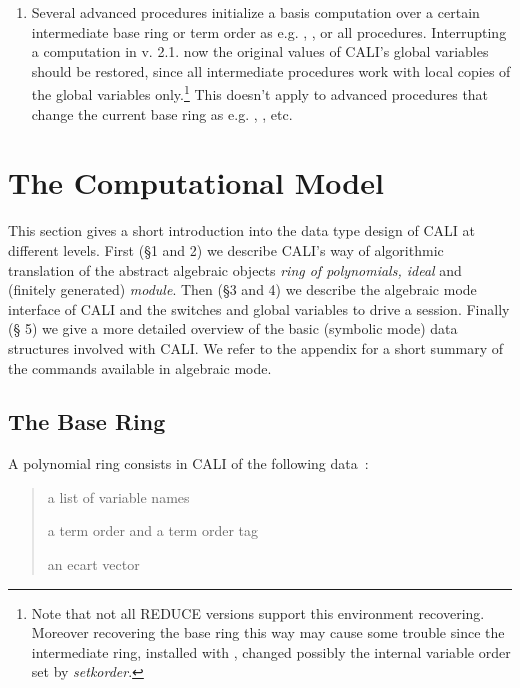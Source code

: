 \begin{enumerate}
\item Several advanced procedures initialize a \gr basis computation
over a certain intermediate base ring or term order as e.g.
, ,  or all
 procedures. Interrupting a computation in
v. 2.1. now the original values of CALI's global variables should be
restored, since all intermediate procedures work with local copies of
the global variables only.\footnote{Note that not all REDUCE versions
support this environment recovering. Moreover recovering the base
ring this way may cause some trouble since the intermediate ring,
installed with , changed possibly the internal variable
order set by {\em setkorder}.} This doesn't apply to advanced
procedures that change the current base ring as e.g. ,
,  etc.

\end{enumerate}

\section{The Computational Model}

This section gives a short introduction into the data type design of
CALI at different levels. First (\S 1 and 2) we describe CALI's way
of algorithmic translation of the abstract algebraic objects {\em
ring of polynomials, ideal} and (finitely generated) {\em module}.
Then (\S 3 and 4) we describe the algebraic mode interface of CALI
and the switches and global variables to drive a session. Finally (\S
5) we give a more detailed overview of the basic (symbolic mode) data
structures involved with CALI. We refer to the appendix for a short
summary of the commands available in algebraic mode.

\subsection{The Base Ring}

A polynomial ring consists in CALI of the following data~:
\begin{quote}
a list of variable names 


a term order and a term order tag


an ecart vector

\end{quote}

